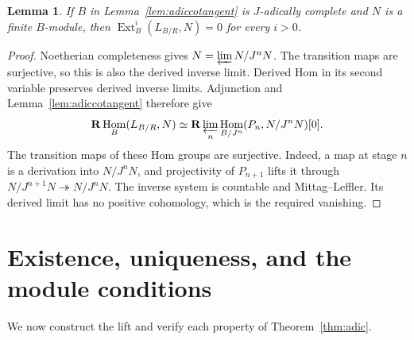 \documentclass[11pt]{article}
\newtheorem{lemma}[theorem]{Lemma}
\theoremstyle{definition}\newtheorem{definition}[theorem]{Definition}
\theoremstyle{remark}\newtheorem{remark}[theorem]{Remark}
\DeclareMathOperator{\Hom}{Hom}\DeclareMathOperator{\Ext}{Ext}\DeclareMathOperator{\Tor}{Tor}
\begin{document}
\begin{lemma}\label{lem:extvanish}
If $B$ in Lemma~\ref{lem:adiccotangent} is $J$-adically complete and $N$ is a finite $B$-module, then $\Ext_B^i(L_{B/R},N)=0$ for every $i>0$.
\end{lemma}
\begin{proof}
Noetherian completeness gives $N=\varprojlim N/J^nN$. The transition maps are surjective, so this is also the derived inverse limit. Derived Hom in its second variable preserves derived inverse limits. Adjunction and Lemma~\ref{lem:adiccotangent} therefore give
\[
 \mathbf R\Hom_B(L_{B/R},N)
 \simeq \mathbf R\varprojlim_n
 \Hom_{B/J^n}(P_n,N/J^nN)[0].
\]
The transition maps of these Hom groups are surjective. Indeed, a map at stage $n$ is a derivation into $N/J^nN$, and projectivity of $P_{n+1}$ lifts it through $N/J^{n+1}N\twoheadrightarrow N/J^nN$. The inverse system is countable and Mittag--Leffler. Its derived limit has no positive cohomology, which is the required vanishing.
\end{proof}

\section{Existence, uniqueness, and the module conditions}

We now construct the lift and verify each property of Theorem~\ref{thm:adic}.
\end{document}
